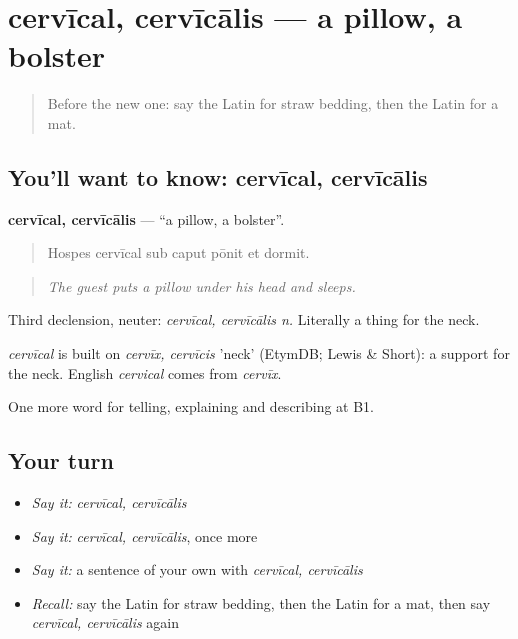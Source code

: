 \section[cervīcal, cervīcālis]{cervīcal, cervīcālis — a pillow, a bolster}

\label{lesson:LA-C446-cervical}



\begin{quote}
Before the new one: say the Latin for straw bedding, then the Latin for a mat.
\end{quote}

\subsection*{You'll want to know: cervīcal, cervīcālis}
\textbf{cervīcal, cervīcālis} — \textquotedblleft{}a pillow, a bolster\textquotedblright{}.

\begin{quote}
Hospes cervīcal sub caput pōnit et dormit.
\end{quote}

\begin{quote}
\emph{The guest puts a pillow under his head and sleeps.}
\end{quote}

Third declension, neuter: \emph{cervīcal, cervīcālis n.} Literally a thing for the neck.

\begin{cousinweb}
\emph{cervīcal} is built on \emph{cervīx, cervīcis} 'neck' (EtymDB; Lewis \& Short): a support for the neck. English \emph{cervical} comes from \emph{cervīx}.
\end{cousinweb}

\begin{grammarlens}[title={What you've built}]
One more word for telling, explaining and describing at B1.
\end{grammarlens}

\subsection*{Your turn}
\begin{itemize}
\raggedright
  \item \emph{Say it:} \emph{cervīcal, cervīcālis}
  \item \emph{Say it:} \emph{cervīcal, cervīcālis}, once more
  \item \emph{Say it:} a sentence of your own with \emph{cervīcal, cervīcālis}
  \item \emph{Recall:} say the Latin for straw bedding, then the Latin for a mat, then say \emph{cervīcal, cervīcālis} again
\end{itemize}

